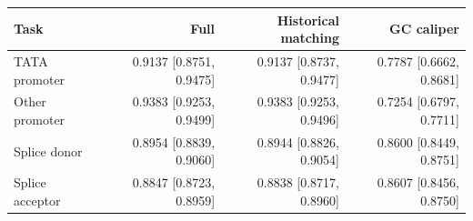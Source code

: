 \begin{tabular}{lrrr}
\toprule
Task & Full & Historical matching & GC caliper \\
\midrule
TATA promoter & 0.9137 [0.8751, 0.9475] & 0.9137 [0.8737, 0.9477] & 0.7787 [0.6662, 0.8681] \\
Other promoter & 0.9383 [0.9253, 0.9499] & 0.9383 [0.9253, 0.9496] & 0.7254 [0.6797, 0.7711] \\
Splice donor & 0.8954 [0.8839, 0.9060] & 0.8944 [0.8826, 0.9054] & 0.8600 [0.8449, 0.8751] \\
Splice acceptor & 0.8847 [0.8723, 0.8959] & 0.8838 [0.8717, 0.8960] & 0.8607 [0.8456, 0.8750] \\
\bottomrule
\end{tabular}
